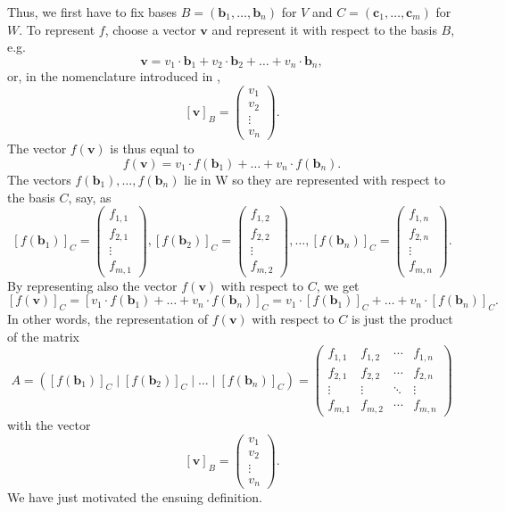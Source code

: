 Thus, we first have to fix bases $B = (\mathbf{b}_1,\ldots,\mathbf{b}_n)$ for
$V$ and $C = (\mathbf{c}_1,\ldots,\mathbf{c}_m)$ for $W$. To represent $f$,
choose a vector $\mathbf{v}$ and represent it with respect to the basis $B$,
e.g.
\[
 \mathbf{v} = v_1 \cdot \mathbf{b}_1 + v_2 \cdot \mathbf{b}_2 + \ldots + v_n
 \cdot \mathbf{b}_n,
\]
or, in the nomenclature introduced in
,
\[
 [\mathbf{v}]_{B} = 
 \begin{pmatrix}
  v_1\\
  v_2\\
  \vdots\\
  v_n
 \end{pmatrix}.
\]
The vector $f(\mathbf{v})$ is thus equal to
\[
 f(\mathbf{v}) = v_1 \cdot f(\mathbf{b}_1) + \ldots + v_n \cdot f(\mathbf{b}_n).
\]
The vectors $f(\mathbf{b}_1),\ldots,f(\mathbf{b}_n)$ lie in W so they are
represented with respect to the basis $C$, say, as
\[
 [f(\mathbf{b}_1)]_C = 
 \begin{pmatrix}
  f_{1,1}\\
  f_{2,1}\\
  \vdots\\
  f_{m,1}
 \end{pmatrix},
 [f(\mathbf{b}_2)]_C =
 \begin{pmatrix}
  f_{1,2}\\
  f_{2,2}\\
  \vdots\\
  f_{m,2}
 \end{pmatrix},\ldots,
 [f(\mathbf{b}_n)]_C =
 \begin{pmatrix}
  f_{1,n}\\
  f_{2,n}\\
  \vdots\\
  f_{m,n}
 \end{pmatrix}.
\]
By representing also the vector $f(\mathbf{v})$ with respect to $C$, we get
\[
 [f(\mathbf{v})]_C = [v_1 \cdot f(\mathbf{b}_1) + \ldots + v_n \cdot
 f(\mathbf{b}_n)]_C = v_1 \cdot [f(\mathbf{b}_1)]_C + \ldots + v_n \cdot
 [f(\mathbf{b}_n)]_C.
\]
In other words, the representation of $f(\mathbf{v})$ with respect to $C$ is
just the product of the matrix
\[
 A = ([f(\mathbf{b}_1)]_C \mid [f(\mathbf{b}_2)]_C \mid \ldots \mid
 [f(\mathbf{b}_n)]_C) = 
 \begin{pmatrix}
  f_{1,1} & f_{1,2} & \cdots & f_{1,n}\\
  f_{2,1} & f_{2,2} & \cdots & f_{2,n}\\
  \vdots & \vdots & \ddots & \vdots\\
  f_{m,1} & f_{m,2} & \cdots & f_{m,n}
 \end{pmatrix}
\]
with the vector
\[
 [\mathbf{v}]_B = 
 \begin{pmatrix}
  v_1\\
  v_2\\
  \vdots\\
  v_n
 \end{pmatrix}.
\]
We have just motivated the ensuing definition.

